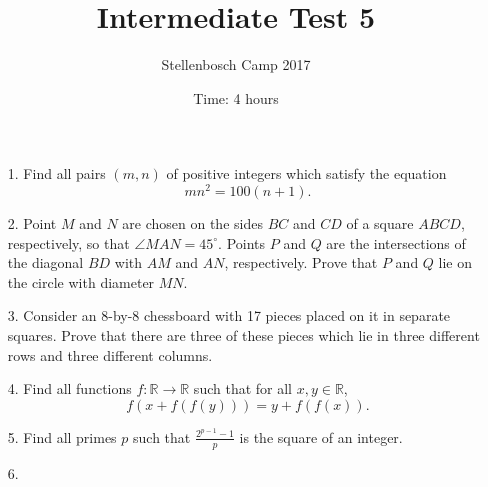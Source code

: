 \documentclass[12pt]{article}
\title{Intermediate Test 5}
\author{Stellenbosch Camp 2017}
\date{Time: 4 hours}
\begin{document}
 \maketitle

\begin{enumerate}

\item[1.] %
Find all pairs $(m,n)$ of positive integers which satisfy the equation
  \[ mn^2 = 100(n+1). \]


\item[2.] %
Point $M$ and $N$ are chosen on the sides $BC$ and $CD$ of a square $ABCD$, respectively, so that $\angle MAN = 45^\circ$. Points $P$ and $Q$ are the intersections of the diagonal $BD$ with $AM$ and $AN$, respectively. Prove that $P$ and $Q$ lie on the circle with diameter $MN$.


\item[3.] %
Consider an 8-by-8 chessboard with 17 pieces placed on it in separate squares. Prove that there are three of these pieces which lie in three different rows and three different columns.


\item[4.] %
Find all functions $f: \mathbb{R} \to \mathbb{R}$ such that for all $x,y \in \mathbb{R}$,
  \[ f(x+f(f(y))) = y+f(f(x)). \]


\item[5.] %
Find all primes $p$ such that $\displaystyle \frac{2^{p-1}-1}{p}$ is the square of an integer.
 

\item[6.] %


\end{enumerate}

\vfill

\centering
\begin{BVerbatim}
\end{BVerbatim}
\end{document}
